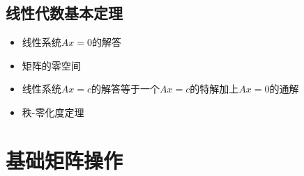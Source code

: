 

% 

\subsection{线性代数基本定理}

\begin{note}
    \begin{itemize}
        \item 线性系统$Ax=0$的解答
        \item 矩阵的零空间
        \item 线性系统$Ax=c$的解答等于一个$Ax=c$的特解加上$Ax=0$的通解
        \item 秩-零化度定理
    \end{itemize}
\end{note}

\section{基础矩阵操作}



